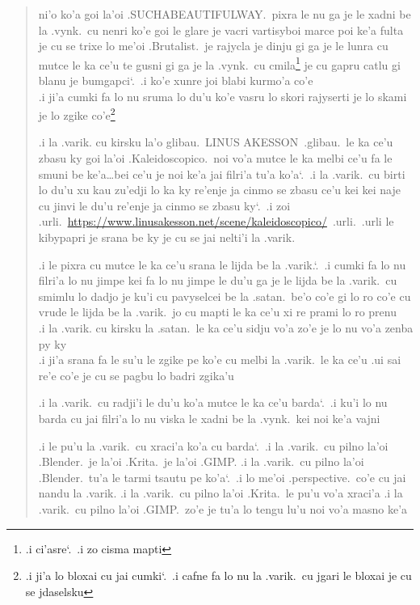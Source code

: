 \documentclass{report}
\newcommand\sds{\spacefactor\sfcode`.\ \space}
\begin{document}
\begin{quote}
	ni'o ko'a goi la'oi .SUCHABEAUTIFULWAY.\ pixra le nu ga je le xadni be la .vynk.\ cu nenri ko'e goi le glare je vacri vartisyboi marce poi ke'a fulta je cu se trixe lo me'oi .Brutalist.\ je rajycla je dinju gi ga je le lunra cu mutce le ka ce'u te gusni gi ga je la .vynk.\ cu cmila\footnote{.i ci'asre\sds  .i zo cisma mapti} je cu gapru catlu gi blanu je bumgapci\sds  .i ko'e xunre joi blabi kurmo'a co'e\\
.i ji'a cumki fa lo nu sruma lo du'u ko'e vasru lo skori rajyserti je lo skami je lo zgike co'e\footnote{.i ji'a lo bloxai cu jai cumki\sds  .i cafne fa lo nu la .varik.\ cu jgari le bloxai je cu se jdaselsku}

	.i la .varik. cu kirsku la'o glibau.\ LINUS AKESSON\ .glibau.\ le ka ce'u zbasu ky goi la'oi .Kaleidoscopico.\ noi vo'a mutce le ka melbi ce'u fa le smuni be ke'a\ldots bei ce'u je noi ke'a jai filri'a tu'a ko'a\sds  .i la .varik.\ cu birti lo du'u xu kau zu'edji lo ka ky re'enje ja cinmo se zbasu ce'u kei kei naje cu jinvi le du'u re'enje ja cinmo se zbasu ky\sds  .i zoi .urli.\ \url{https://www.linusakesson.net/scene/kaleidoscopico/}\ .urli.\ .urli le kibypapri je srana be ky je cu se jai nelti'i la .varik.

	.i le pixra cu mutce le ka ce'u srana le lijda be la .varik.\sds  .i cumki fa lo nu filri'a lo nu jimpe kei fa lo nu jimpe le du'u ga je le lijda be la .varik.\ cu smimlu lo dadjo je ku'i cu pavyselcei be la .satan.\ be'o co'e gi lo ro co'e cu vrude le lijda be la .varik.\ jo cu mapti le ka ce'u xi re prami lo ro prenu\\
	.i la .varik. cu kirsku la .satan.\ le ka ce'u sidju vo'a zo'e je lo nu vo'a zenba py ky \\
	.i ji'a srana fa le su'u le zgike pe ko'e cu melbi la .varik.\ le ka ce'u .ui sai re'e co'e je cu se pagbu lo badri zgika'u

	.i la .varik.\ cu radji'i le du'u ko'a mutce le ka ce'u barda\sds  .i ku'i lo nu barda cu jai filri'a lo nu viska le xadni be la .vynk.\ kei noi ke'a vajni

	.i le pu'u la .varik.\ cu xraci'a ko'a cu barda\sds  .i la .varik.\ cu pilno la'oi .Blender.\ je la'oi .Krita.\ je la'oi .GIMP.
	.i la .varik.\ cu pilno la'oi .Blender.\ tu'a le tarmi tsautu pe ko'a\sds  .i lo me'oi .perspective.\ co'e cu jai nandu la .varik.
	.i la .varik.\ cu pilno la'oi .Krita.\ le pu'u vo'a xraci'a
	.i la .varik.\ cu pilno la'oi .GIMP.\ zo'e je tu'a lo tengu lu'u noi vo'a masno ke'a


\end{quote}
\end{document}
